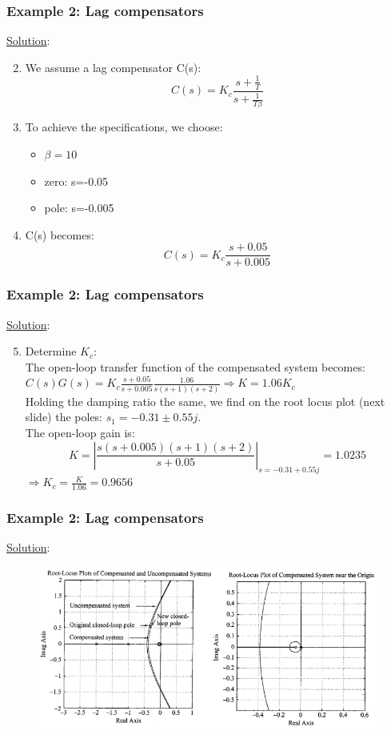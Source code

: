 \begin{frame}
	\frametitle{Example 2: Lag compensators}
	\underline{Solution}:
	\begin{enumerate}
		\setcounter{enumi}{1}
		\item We assume a lag compensator C(s): $$C(s)=K_c\frac{s+\frac{1}{T}}{s+\frac{1}{T\beta}}$$
		\item To achieve the specifications, we choose: 
		\begin{itemize}
			\item $\beta=10$
			\item zero: s=-0.05
			\item pole: s=-0.005
		\end{itemize}
		\item C(s) becomes: 
		$$C(s)=K_c\frac{s+0.05}{s+0.005}$$
	\end{enumerate}
\end{frame}

\begin{frame}
	\frametitle{Example 2: Lag compensators}
	\underline{Solution}:
	\begin{enumerate}
		\setcounter{enumi}{4}
		\item Determine $K_c$:\\
		The open-loop transfer function of the compensated system becomes:\\
		$C(s)G(s)=K_c\frac{s+0.05}{s+0.005}\frac{1.06}{s(s+1)(s+2)} \Rightarrow K=1.06K_c$\\
		Holding the damping ratio the same, we find on the root locus plot (next slide) the poles: $s_1=-0.31\pm0.55j$.\\
		The open-loop gain is:
		$$K=|\frac{s(s+0.005)(s+1)(s+2)}{s+0.05}|_{s=-0.31+0.55j}=1.0235$$
		$\Rightarrow K_c=\frac{K}{1.06}=0.9656$
	\end{enumerate}
\end{frame}

\begin{frame}
	\frametitle{Example 2: Lag compensators}
	\underline{Solution}:
			\begin{figure}
				\centering
				\includegraphics[width=1\linewidth]{Ex2_rootlocusnew}
			\end{figure}
\end{frame}

